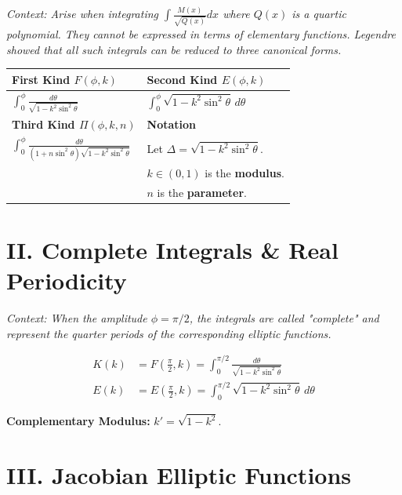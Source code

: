 \documentclass[11pt, a4paper]{article}
\begin{document}
\textit{\small Context: Arise when integrating $\int \frac{M(x)}{\sqrt{Q(x)}} dx$ where $Q(x)$ is a quartic polynomial. They cannot be expressed in terms of elementary functions. Legendre showed that all such integrals can be reduced to three canonical forms.}

\begin{center}
\begin{tabular}{@{}p{} p{}@{}}
\toprule
\textbf{First Kind $F(\phi, k)$} & \textbf{Second Kind $E(\phi, k)$} \\
\midrule
$\displaystyle \int_0^\phi \frac{d\theta}{\sqrt{1-k^2\sin^2\theta}}$ & $\displaystyle \int_0^\phi \sqrt{1-k^2\sin^2\theta} \, d\theta$ \\
\midrule
\textbf{Third Kind $\Pi(\phi, k, n)$} & \textbf{Notation} \\
\midrule
$\displaystyle \int_0^\phi \frac{d\theta}{(1+n\sin^2\theta)\sqrt{1-k^2\sin^2\theta}}$ & Let $\Delta = \sqrt{1-k^2\sin^2\theta}$. \\
& $k \in (0,1)$ is the \textbf{modulus}. \\
& $n$ is the \textbf{parameter}. \\
\bottomrule
\end{tabular}
\end{center}

\vspace{0.3cm}

\section*{\color{primary} II. Complete Integrals \& Real Periodicity}

\textit{\small Context: When the amplitude $\phi = \pi/2$, the integrals are called "complete" and represent the quarter periods of the corresponding elliptic functions.}

\begin{align*}
    K(k) &= F\left(\frac{\pi}{2}, k\right) = \int_0^{\pi/2} \frac{d\theta}{\sqrt{1-k^2\sin^2\theta}} \\
    E(k) &= E\left(\frac{\pi}{2}, k\right) = \int_0^{\pi/2} \sqrt{1-k^2\sin^2\theta} \, d\theta
\end{align*}

\textbf{\color{accent}Complementary Modulus:} $k' = \sqrt{1-k^2}$.

\vspace{0.3cm}

\section*{\color{primary} III. Jacobian Elliptic Functions}
\end{document}
